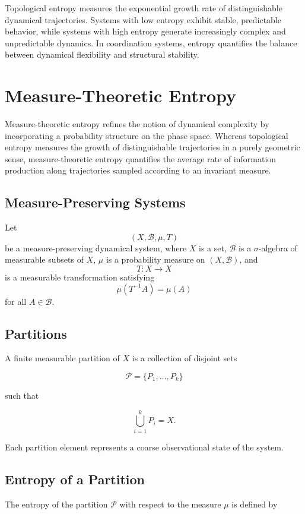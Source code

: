 \documentclass[12pt]{article}
\begin{document}
Topological entropy measures the exponential growth rate of distinguishable dynamical trajectories. Systems with low entropy exhibit stable, predictable behavior, while systems with high entropy generate increasingly complex and unpredictable dynamics. In coordination systems, entropy quantifies the balance between dynamical flexibility and structural stability.

\section{Measure-Theoretic Entropy}

Measure-theoretic entropy refines the notion of dynamical complexity by incorporating a probability structure on the phase space. Whereas topological entropy measures the growth of distinguishable trajectories in a purely geometric sense, measure-theoretic entropy quantifies the average rate of information production along trajectories sampled according to an invariant measure.

\subsection{Measure-Preserving Systems}

Let
\[
(X,\mathcal{B},\mu,T)
\]
be a measure-preserving dynamical system, where $X$ is a set, $\mathcal{B}$ is a $\sigma$-algebra of measurable subsets of $X$, $\mu$ is a probability measure on $(X,\mathcal{B})$, and
\[
T : X \rightarrow X
\]
is a measurable transformation satisfying
\[
\mu(T^{-1}A) = \mu(A)
\]
for all $A \in \mathcal{B}$.

\subsection{Partitions}

A finite measurable partition of $X$ is a collection of disjoint sets

\[
\mathcal{P} = \{P_1,\dots,P_k\}
\]

such that

\[
\bigcup_{i=1}^k P_i = X.
\]

Each partition element represents a coarse observational state of the system.

\subsection{Entropy of a Partition}

The entropy of the partition $\mathcal{P}$ with respect to the measure $\mu$ is defined by
\end{document}
